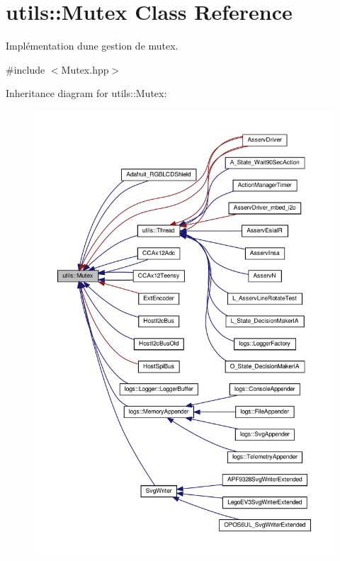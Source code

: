 \hypertarget{classutils_1_1Mutex}{}\section{utils\+:\+:Mutex Class Reference}
\label{classutils_1_1Mutex}


Implémentation d\textquotesingle{}une gestion de mutex.  




{\ttfamily \#include $<$Mutex.\+hpp$>$}



Inheritance diagram for utils\+:\+:Mutex\+:
\nopagebreak
\begin{figure}[H]
\begin{center}
\leavevmode
\includegraphics[width=350pt]{classutils_1_1Mutex__inherit__graph}
\end{center}
\end{figure}
